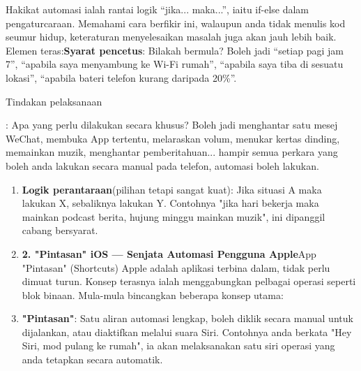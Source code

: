 


Hakikat automasi ialah rantai logik “jika... maka...”, iaitu if-else dalam pengaturcaraan. Memahami cara berfikir ini, walaupun anda tidak menulis kod seumur hidup, keteraturan menyelesaikan masalah juga akan jauh lebih baik. Elemen teras:\textbf{Syarat pencetus}: Bilakah bermula? Boleh jadi “setiap pagi jam 7”, “apabila saya menyambung ke Wi-Fi rumah”, “apabila saya tiba di sesuatu lokasi”, “apabila bateri telefon kurang daripada 20\%”.

Tindakan pelaksanaan

: Apa yang perlu dilakukan secara khusus? Boleh jadi menghantar satu mesej WeChat, membuka App tertentu, melaraskan volum, menukar kertas dinding, memainkan muzik, menghantar pemberitahuan... hampir semua perkara yang boleh anda lakukan secara manual pada telefon, automasi boleh lakukan.

\begin{enumerate}
  \item \textbf{Logik perantaraan}(pilihan tetapi sangat kuat): Jika situasi A maka lakukan X, sebaliknya lakukan Y. Contohnya "jika hari bekerja maka mainkan podcast berita, hujung minggu mainkan muzik", ini dipanggil cabang bersyarat.
  \item \textbf{2. "Pintasan" iOS — Senjata Automasi Pengguna Apple}App "Pintasan" (Shortcuts) Apple adalah aplikasi terbina dalam, tidak perlu dimuat turun. Konsep terasnya ialah menggabungkan pelbagai operasi seperti blok binaan. Mula-mula bincangkan beberapa konsep utama:
  \item \textbf{"Pintasan"}: Satu aliran automasi lengkap, boleh diklik secara manual untuk dijalankan, atau diaktifkan melalui suara Siri. Contohnya anda berkata "Hey Siri, mod pulang ke rumah", ia akan melaksanakan satu siri operasi yang anda tetapkan secara automatik.
\end{enumerate}

